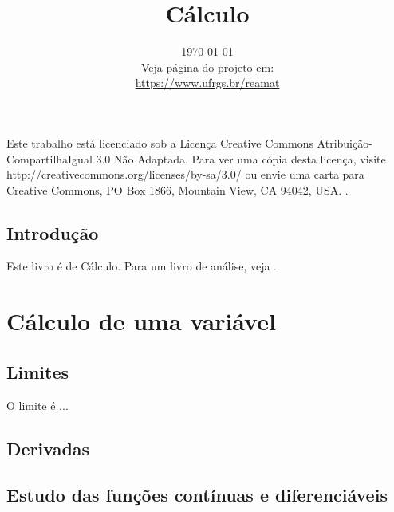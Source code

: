 \documentclass[12pt]{book}
\begin{document}
\frontmatter

\title{Cálculo}
\date{\today\vspace{1cm}\\\small{Veja página do projeto em:\\
\url{https://www.ufrgs.br/reamat}}}

\maketitle





\newpage

\par Este trabalho está licenciado sob a Licença Creative Commons Atribuição-CompartilhaIgual 3.0 Não Adaptada. Para ver uma cópia desta licença, visite http://creativecommons.org/licenses/by-sa/3.0/ ou envie uma carta para Creative Commons, PO Box 1866, Mountain View, CA 94042, USA.
.


\mainmatter

\tableofcontents
\listoffigures
\listoftables

\cleardoublepage
\chapter*{Introdução}

Este livro é de Cálculo. Para um livro de análise, veja \cite{Rudin}.


\part{Cálculo de uma variável}

\chapter{Limites}
O limite é ... 
\chapter{Derivadas}

\chapter{Estudo das funções contínuas e diferenciáveis}
\end{document}
